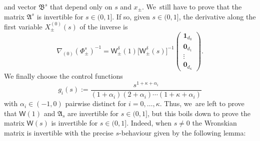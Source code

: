 \documentclass[10pt,a4paper]{amsart}
\theoremstyle{definition}
\newcommand{\sW}{{\mathsf W}}
\newcommand{\U}{\mathbf{1}}
\newcommand{\V}{\mathbf{0}}
\begin{document}
and vector $\mathfrak B^s$ that depend only on $s$ and $x_\pm$. We~still have to prove that the matrix $\mathfrak A^s$ is
invertible for $s \in (0,1]$. If so, given $s \in (0,1]$, the
derivative along the first variable $X^{(0)}_\pm(s)$ of the
inverse is
\begin{equation}
\label{eq:first-der-k}
\nabla_{(0)} \left(\Phi_\pm ^s \right)^{-1} = \sW_\pm ^\delta
(1) \big[\sW_\pm ^\delta(s)\big]^{-1}
\begin{pmatrix}
\U_{d_0} \\ \V_{d_1} \\ \vdots \\ \V_{d_\kappa}
\end{pmatrix}\!.
\end{equation}
We finally choose the control functions
\begin{equation}\label{eq:choice-g}
g_i(s) := \frac{s^{1+\kappa+\alpha_i}}{(1+\alpha_i)(2+\alpha_i)
\cdots (1+\kappa+\alpha_i)}
\end{equation}
with $\alpha_i \in (-1,0)$ pairwise distinct for
$i=0,\dots,\kappa$.
Thus, we~are left to prove that $\mathsf W(1)$ and $\mathfrak{A}_s$ are invertible for $s \in (0,1]$, but this boils down to prove the matrix $\mathsf W(s)$ is invertible for $s \in (0,1]$. Indeed, when $s \ne 0$ the Wronskian matrix is
invertible with the precise $s$-behaviour given by the following
lemma:
\end{document}
